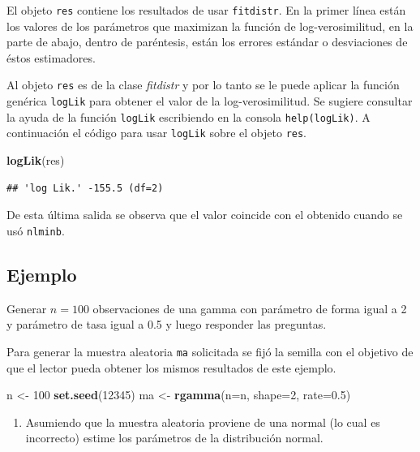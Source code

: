 \documentclass[10pt,]{krantz}
\makeatletter
\newenvironment{Shaded}{\begin{snugshade}}{\end{snugshade}}
\newcommand{\KeywordTok}[1]{\textcolor[rgb]{0.13,0.29,0.53}{\textbf{#1}}}
\newcommand{\DataTypeTok}[1]{\textcolor[rgb]{0.13,0.29,0.53}{#1}}
\newcommand{\DecValTok}[1]{\textcolor[rgb]{0.00,0.00,0.81}{#1}}
\newcommand{\FloatTok}[1]{\textcolor[rgb]{0.00,0.00,0.81}{#1}}
\newcommand{\StringTok}[1]{\textcolor[rgb]{0.31,0.60,0.02}{#1}}
\newcommand{\NormalTok}[1]{#1}
\providecommand{\tightlist}{%
  \setlength{\itemsep}{0pt}\setlength{\parskip}{0pt}}
\newenvironment{kframe}{%
\medskip{}
\setlength{\fboxsep}{.8em}
 \def\at@end@of@kframe{}%
 \ifinner\ifhmode%
  \def\at@end@of@kframe{\end{minipage}}%
  \begin{minipage}{\columnwidth}%
 \fi\fi%
 \def\FrameCommand##1{\hskip\@totalleftmargin \hskip-\fboxsep
 \colorbox{shadecolor}{##1}\hskip-\fboxsep
     \hskip-\linewidth \hskip-\@totalleftmargin \hskip\columnwidth}%
 \MakeFramed {\advance\hsize-\width
   \@totalleftmargin\z@ \linewidth\hsize
   \@setminipage}}%
 {\par\unskip\endMakeFramed%
 \at@end@of@kframe}
\renewenvironment{Shaded}{\begin{kframe}}{\end{kframe}}
\makeatother
\begin{document}
El objeto \texttt{res} contiene los resultados de usar
\texttt{fitdistr}. En la primer línea están los valores de los
parámetros que maximizan la función de log-verosimilitud, en la parte de
abajo, dentro de paréntesis, están los errores estándar o desviaciones
de éstos estimadores.

Al objeto \texttt{res} es de la clase \emph{fitdistr} y por lo tanto se
le puede aplicar la función genérica \texttt{logLik} para obtener el
valor de la log-verosimilitud. Se sugiere consultar la ayuda de la
función \texttt{logLik} escribiendo en la consola \texttt{help(logLik)}.
A continuación el código para usar \texttt{logLik} sobre el objeto
\texttt{res}.

\begin{Shaded}
\begin{Highlighting}[]
\KeywordTok{logLik}\NormalTok{(res)}
\end{Highlighting}
\end{Shaded}

\begin{verbatim}
## 'log Lik.' -155.5 (df=2)
\end{verbatim}

De esta última salida se observa que el valor coincide con el obtenido
cuando se usó \texttt{nlminb}.

\subsection*{Ejemplo}\label{ejemplo-51}


Generar \(n=100\) observaciones de una gamma con parámetro de forma
igual a 2 y parámetro de tasa igual a 0.5 y luego responder las
preguntas.

Para generar la muestra aleatoria \texttt{ma} solicitada se fijó la
semilla con el objetivo de que el lector pueda obtener los mismos
resultados de este ejemplo.

\begin{Shaded}
\begin{Highlighting}[]
\NormalTok{n <-}\StringTok{ }\DecValTok{100}
\KeywordTok{set.seed}\NormalTok{(}\DecValTok{12345}\NormalTok{)}
\NormalTok{ma <-}\StringTok{ }\KeywordTok{rgamma}\NormalTok{(}\DataTypeTok{n=}\NormalTok{n, }\DataTypeTok{shape=}\DecValTok{2}\NormalTok{, }\DataTypeTok{rate=}\FloatTok{0.5}\NormalTok{)}
\end{Highlighting}
\end{Shaded}

\begin{enumerate}
\def\labelenumi{\arabic{enumi})}
\tightlist
\item
  Asumiendo que la muestra aleatoria proviene de una normal (lo cual es
  incorrecto) estime los parámetros de la distribución normal.
\end{enumerate}
\end{document}
